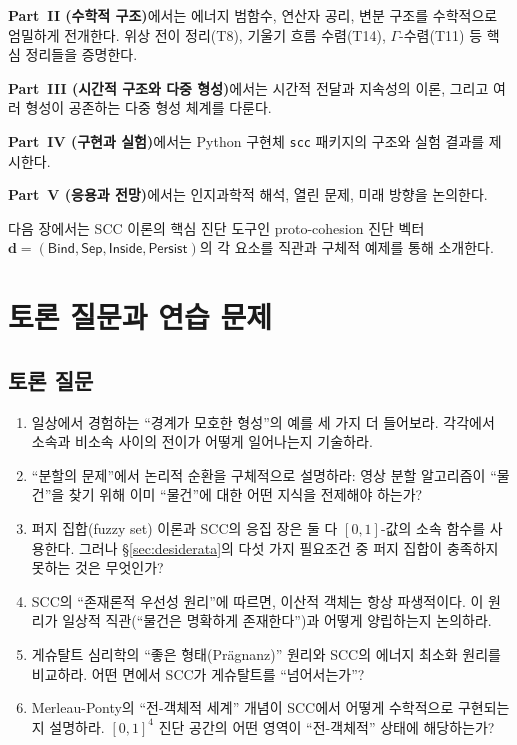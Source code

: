 \textbf{Part~II (수학적 구조)}에서는 에너지 범함수, 연산자 공리, 변분 구조를 수학적으로 엄밀하게 전개한다. 위상 전이 정리(T8), 기울기 흐름 수렴(T14), $\Gamma$-수렴(T11) 등 핵심 정리들을 증명한다.

\textbf{Part~III (시간적 구조와 다중 형성)}에서는 시간적 전달과 지속성의 이론, 그리고 여러 형성이 공존하는 다중 형성 체계를 다룬다.

\textbf{Part~IV (구현과 실험)}에서는 Python 구현체 \texttt{scc} 패키지의 구조와 실험 결과를 제시한다.

\textbf{Part~V (응용과 전망)}에서는 인지과학적 해석, 열린 문제, 미래 방향을 논의한다.

\bigskip

다음 장에서는 SCC 이론의 핵심 진단 도구인 proto-cohesion 진단 벡터 $\mathbf{d} = (\mathsf{Bind}, \mathsf{Sep}, \mathsf{Inside}, \mathsf{Persist})$의 각 요소를 직관과 구체적 예제를 통해 소개한다.


\section{토론 질문과 연습 문제}
\label{sec:ch1-exercises}

\subsection*{토론 질문}

\begin{enumerate}
    \item 일상에서 경험하는 ``경계가 모호한 형성''의 예를 세 가지 더 들어보라. 각각에서 소속과 비소속 사이의 전이가 어떻게 일어나는지 기술하라.

    \item ``분할의 문제''에서 논리적 순환을 구체적으로 설명하라: 영상 분할 알고리즘이 ``물건''을 찾기 위해 이미 ``물건''에 대한 어떤 지식을 전제해야 하는가?

    \item 퍼지 집합(fuzzy set) 이론과 SCC의 응집 장은 둘 다 $[0,1]$-값의 소속 함수를 사용한다. 그러나 \S\ref{sec:desiderata}의 다섯 가지 필요조건 중 퍼지 집합이 충족하지 못하는 것은 무엇인가?

    \item SCC의 ``존재론적 우선성 원리''에 따르면, 이산적 객체는 항상 파생적이다. 이 원리가 일상적 직관(``물건은 명확하게 존재한다'')과 어떻게 양립하는지 논의하라.

    \item 게슈탈트 심리학의 ``좋은 형태(Pr\"agnanz)'' 원리와 SCC의 에너지 최소화 원리를 비교하라. 어떤 면에서 SCC가 게슈탈트를 ``넘어서는가''?

    \item Merleau-Ponty의 ``전-객체적 세계'' 개념이 SCC에서 어떻게 수학적으로 구현되는지 설명하라. $[0,1]^4$ 진단 공간의 어떤 영역이 ``전-객체적'' 상태에 해당하는가?
\end{enumerate}


